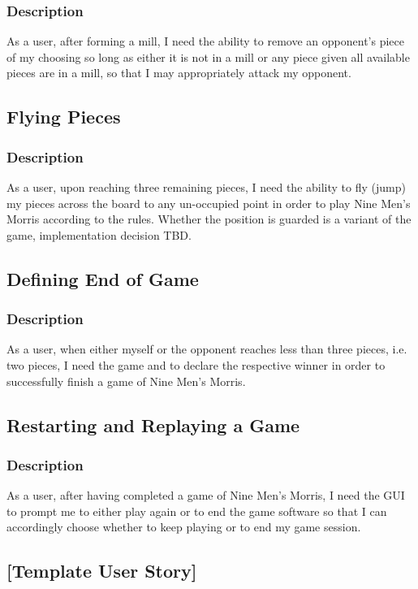 \documentclass[11pt]{article}
\begin{document}
\subsubsection*{Description}
\label{sec:org0e6057a}
As a user, after forming a mill, I need the ability to remove an opponent's piece of my choosing
so long as either it is not in a mill or any piece given all available pieces are in a mill, so
that I may appropriately attack my opponent.
\subsection{Flying Pieces}
\label{sec:org7a7e2cd}
\subsubsection*{Description}
\label{sec:orga27ec18}
As a user, upon reaching three remaining pieces, I need the ability to fly (jump) my pieces
across the board to any un-occupied point in order to play Nine Men's Morris according to the
rules. Whether the position is guarded is a variant of the game, implementation decision TBD.
\subsection{Defining End of Game}
\label{sec:org8aae30b}
\subsubsection*{Description}
\label{sec:org65acd57}
As a user, when either myself or the opponent reaches less than three pieces, i.e. two pieces, I
need the game and to declare the respective winner in order to successfully finish a game of
Nine Men's Morris.
\subsection{Restarting and Replaying a Game}
\label{sec:orgad8aff7}
\subsubsection*{Description}
\label{sec:orge4a7364}
As a user, after having completed a game of Nine Men's Morris, I need the GUI to prompt me to
either play again or to end the game software so that I can accordingly choose whether to keep
playing or to end my game session.
\subsection*{[Template User Story]}
\label{sec:orgb1cce0c}
\end{document}
